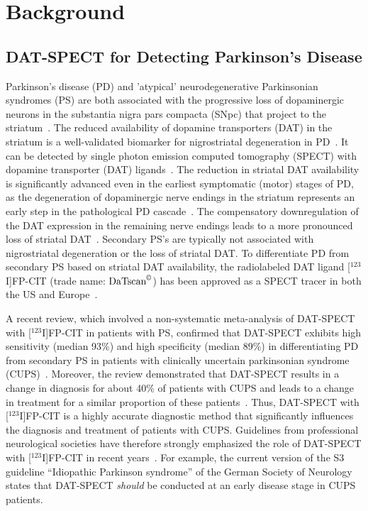 \section{Background}
\label{sec:background}

\subsection{DAT-SPECT for Detecting Parkinson's Disease}
\label{subsec:datspect}


Parkinson's disease (PD) and 'atypical' neurodegenerative Parkinsonian syndromes (PS) 
are both associated with the progressive loss of dopaminergic neurons in the substantia nigra pars compacta (SNpc) 
that project to the striatum~\citep{Piggott1999}.
The reduced availability of dopamine transporters (DAT) in the striatum is a well-validated biomarker 
for nigrostriatal degeneration in PD~\citep{Bernheimer1973, Fazio2018, Niznik1991}.
It can be detected by single photon emission computed tomography (SPECT) 
with dopamine transporter (DAT) ligands~\citep{Kuikka1995, Abi-Dargham1996}.
The reduction in striatal DAT availability is significantly advanced 
even in the earliest symptomatic (motor) stages of PD, 
as the degeneration of dopaminergic nerve endings in the striatum represents 
an early step in the pathological PD cascade~\citep{Bernheimer1973, Fazio2018, Niznik1991}.
The compensatory downregulation of the DAT expression in the remaining nerve endings 
leads to a more pronounced loss of striatal DAT~\citep{Lee2000, Saari2017, Honkanen2019}.
Secondary PS's are typically not associated with nigrostriatal degeneration or the loss of striatal DAT. 
To differentiate PD from secondary PS based on striatal DAT availability, 
the radiolabeled DAT ligand [$^{123}$I]FP-CIT (trade name: $\text{DaTscan}^{\copyright}$) 
has been approved as a SPECT tracer in both the US and Europe~\citep{Neumeyer1994}.


A recent review, which involved a non-systematic meta-analysis of DAT-SPECT with [$^{123}$I]FP-CIT in patients with PS, 
confirmed that DAT-SPECT exhibits high sensitivity (median 93\%) and high specificity (median 89\%) 
in differentiating PD from secondary PS in patients with 
clinically uncertain parkinsonian syndrome (CUPS)~\citep{Buchert2019-ya}.
Moreover, the review demonstrated that DAT-SPECT results in a change in diagnosis for about 40\% of patients with CUPS
and leads to a change in treatment for a similar proportion of these patients~\citep{Buchert2019-ya}. 
Thus, DAT-SPECT with [$^{123}$I]FP-CIT is a highly accurate diagnostic method
that significantly influences the diagnosis and treatment of patients with CUPS.
Guidelines from professional neurological societies have therefore strongly emphasized 
the role of DAT-SPECT with [$^{123}$I]FP-CIT in recent years~\citep{Tatsch2013}.
For example, the current version of the S3 guideline “Idiopathic Parkinson syndrome” of the 
German Society of Neurology states that DAT-SPECT \textit{should} be conducted at an early disease stage in CUPS patients.

